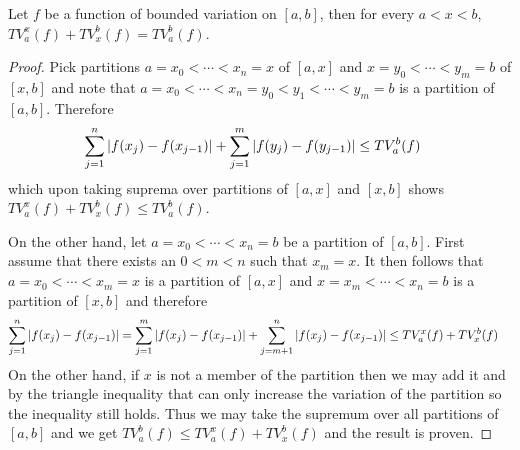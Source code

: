 \begin{lem}\label{AdditivityOfTotalVariation}Let $f$ be a function of
  bounded variation on $[a,b]$, then for every $a < x < b$, $TV_a^x(f)
  + TV_x^b(f) = TV_a^b(f)$.
\end{lem}
\begin{proof}Pick partitions $a=x_0 < \dotsb < x_n=x$ of $[a,x]$ and $x=y_0 <
  \dotsb < y_m=b$ of $[x,b]$ and note that $a=x_0 < \dotsb < x_n=y_0 < y_1 < \dotsb <
  y_m=b$ is a partition of $[a,b]$.  Therefore
\begin{align*}
\sum_{j=1}^n \left \vert f(x_j) - f(x_{j-1}) \right \vert + \sum_{j=1}^m \left \vert f(y_j) -
  f(y_{j-1}) \right \vert &\leq TV_a^b(f)
\end{align*}
which upon taking suprema over partitions of $[a,x]$ and $[x,b]$ shows
$TV_a^x(f) + TV_x^b(f) \leq TV_a^b(f)$.  

On the other hand, let $a=x_0 < \dotsb < x_n=b$ be a partition of
$[a,b]$.  First assume that there exists an $0 < m < n$ such that $x_m
= x$.  It then follows that $a=x_0 < \dotsb < x_m=x$ is a partition of
$[a,x]$ and $x = x_m < \dotsb < x_n=b$ is a partition of $[x,b]$ and
therefore
\begin{align*}
\sum_{j=1}^n \left \vert f(x_j) - f(x_{j-1}) \right \vert &= \sum_{j=1}^m \left \vert f(x_j) -
  f(x_{j-1}) \right \vert + \sum_{j=m+1}^n \left \vert f(x_j) - f(x_{j-1}) \right \vert \leq
TV_a^x(f)  + TV_x^b(f)
\end{align*}
On the other hand, if $x$ is not a member of the partition then we may
add it and by the triangle inequality that can only increase the
variation of the partition so the inequality still holds.  Thus we may
take the supremum over all partitions of $[a,b]$ and we get $TV_a^b(f)
\leq TV_a^x(f)  + TV_x^b(f)$ and the result is proven.
\end{proof}

